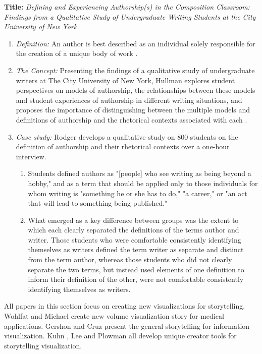 \documentclass{egpubl}
\begin{document}
\textbf{Title:} \textit{Defining and Experiencing Authorship(s) in the Composition Classroom: Findings from a Qualitative Study of Undergraduate
Writing Students at the City University of New York}
\begin{enumerate}
\item \textit{Definition:} An author is best described as an individual solely responsible for the creation of a unique body of work \cite{rodgers2011}.
\item \textit{The Concept:} Presenting the findings of a qualitative study of undergraduate writers at The City University of New York, Hullman explores student perspectives on models of authorship, the relationships between these models and student experiences of authorship in different writing situations, and proposes the importance of distinguishing between the multiple models and definitions of authorship and the rhetorical contexts associated with each \cite{rodgers2011}.
\item \textit{Case study:}
Rodger develops a qualitative study on 800 students on the definition of authorship and their rhetorical contexts over a one-hour interview.
\begin{enumerate}
\item Students defined authors as "[people] who see writing as being beyond a hobby," and as a term that should be applied only to those
individuals for whom writing is "something he or she has to do," "a career," or "an act that will lead to something being published."
\item What emerged as a key difference between groups was the extent to which each clearly separated the definitions of the terms author and writer. Those students who were comfortable consistently identifying themselves as writers defined the term writer as separate and distinct from the term author, whereas those students who did not clearly separate the two terms, but instead used elements of one definition to inform their definition of the other, were not comfortable consistently identifying themselves as writers.
\end{enumerate}
\end{enumerate}

All papers in this section focus on creating new visualizations for storytelling. Wohlfat and Michael \cite{wohlfat} create new volume visualization story for medical applications. Gershon \cite{Gershon2} and Cruz \cite{cruz2011} present the general storytelling for information visualization. Kuhn \cite{kuhn2012}, Lee \cite{lee2013} and Plowman \cite{plowman1999} all develop unique creator tools for storytelling visualization. 
\end{document}
